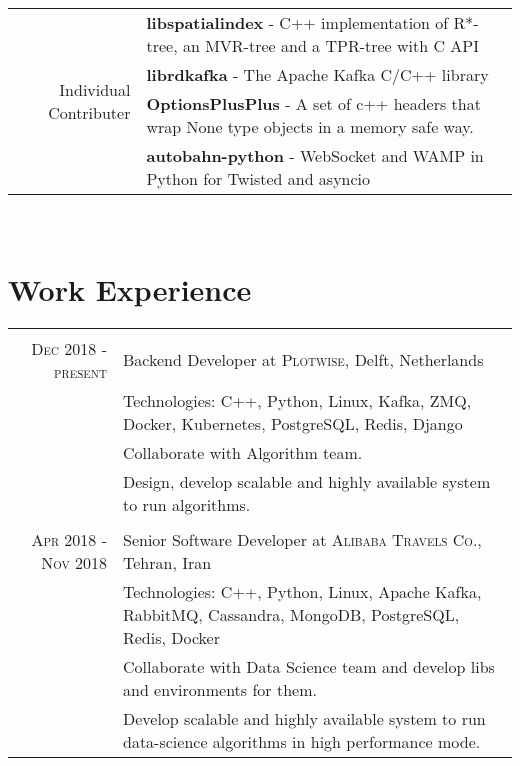 \documentclass[a4paper,11pt]{article}
\begin{document}
\begin{tabular}{r|p{11cm}}

    \multirow{4}{*}{Individual Contributer}
    & \textbf{libspatialindex} - C++ implementation of R*-tree, an MVR-tree and a TPR-tree with C API\\
    & \textbf{librdkafka} - The Apache Kafka C/C++ library\\
    & \textbf{OptionsPlusPlus} - A set of c++ headers that wrap None type objects in a memory safe way.\\
    & \textbf{autobahn-python} - WebSocket and WAMP in Python for Twisted and asyncio\\

\end{tabular}\\

\section{Work Experience}
\begin{tabular}{r|p{11cm}}

    \multicolumn{2}{c}{}\\
    \textsc{Dec 2018 - present}
    & Backend Developer at \textsc{Plotwise},
    Delft, Netherlands\\
    &\footnotesize{Technologies: C++, Python, Linux, Kafka, ZMQ, Docker, Kubernetes, PostgreSQL, Redis, Django}\\
    &\footnotesize{Collaborate with Algorithm team.}\\
    &\footnotesize{Design, develop scalable and highly available system to run algorithms.}\\

    \multicolumn{2}{c}{}\\
    \textsc{Apr 2018 - Nov 2018}
    & Senior Software Developer at \textsc{Alibaba Travels Co.},
    Tehran, Iran\\
    &\footnotesize{Technologies: C++, Python, Linux, Apache Kafka, RabbitMQ, Cassandra, MongoDB, PostgreSQL, Redis, Docker}\\
    &\footnotesize{Collaborate with Data Science team and develop libs and environments for them.}\\
    &\footnotesize{Develop scalable and highly available system to run data-science algorithms in high performance mode.}\\

\end{tabular}
\end{document}
